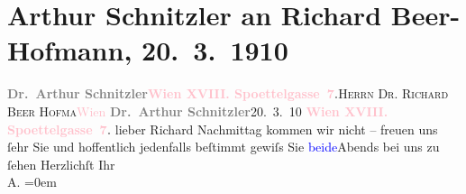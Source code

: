 

               \section[Arthur Schnitzler an Richard Beer-Hofmann, 20. 3. 1910]{ Arthur Schnitzler an Richard Beer-Hofmann, 20. 3. 1910}\nopagebreak{}\rehead{ }\normalsize\beginnumbering{} \toendnotes[C]{\smallbreak\pagebreak[2]} 
\toendnotes[C]{\smallbreak}\pstart{}{\pb}\textcolor{gray}{\textbf{Dr. Arthur Schnitzler}}\pend{}\pstart{}\textcolor{gray}{\textbf{\textcolor{pink}{Wien XVIII. Spoettelgasse 7}{}\ledrightnote{\textcolor{pink}{Edmund-Weiß-Gasse}}.}}\pend{}{\bigskip}\pstart{}{\pb}\textsc{Herrn Dr. Richard Beer Hofma{\geminationn}}\pend{}\pstart{}\textcolor{pink}{Wien}{}\ledrightnote{\textcolor{pink}{Wien}}\pend{}{\bigskip}\pstart
           \noindent{}{\pb}\textcolor{gray}{\textbf{Dr. Arthur Schnitzler}}\hfill 20. 3. 10\pend
           \pstart
           \textcolor{gray}{\textbf{\textcolor{pink}{Wien XVIII. Spoettelgasse 7}{}\ledrightnote{\textcolor{pink}{Edmund-Weiß-Gasse}}.}}\pend
           \pstart{}lieber Richard\pend\pstart
           Nachmittag kommen wir nicht – freuen uns ſehr Sie und hoffentlich {\pb}jedenfalls beſtimmt gewiſs Sie \textcolor{blue}{beide}{}Abends bei uns zu ſehen\pend
           \pstart
           Herzlichſt Ihr{\\[\baselineskip]}\spacefill\mbox{A.}\pend
           \leftskip=0em{}\endnumbering{}  
      